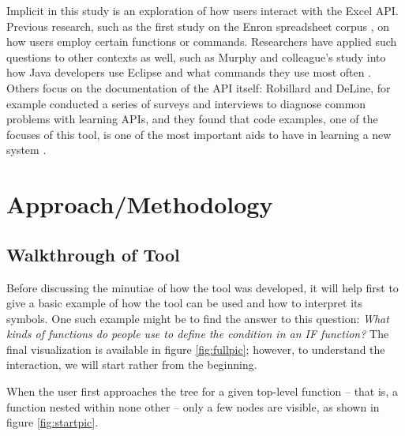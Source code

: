 \documentclass[conference]{IEEEtran}
\begin{document}
	Implicit in this study is an exploration of how users interact with the Excel
	API. Previous research, such as the first study on the Enron spreadsheet corpus
	\cite{hermans2015enron}, on how users employ certain functions or commands.
	Researchers have applied such questions to other contexts as well, such as
	Murphy and colleague's study into how Java developers use Eclipse and what
	commands they use most often \cite{murphy2006java}.  Others focus on the
	documentation of the API itself: Robillard and DeLine, for example conducted a
	series of surveys and interviews to diagnose common problems with learning
	APIs, and they found that code examples, one of the focuses of this tool, is
	one of the most important aids to have in learning a new system
	\cite{robillard2011field}.
	
	\section{Approach/Methodology} \subsection{Walkthrough of Tool} Before
	discussing the minutiae of how the tool was developed, it will help first to
	give a basic example of how the tool can be used and how to interpret its
	symbols. One such example might be to find the answer to this question:
	\textit{ What kinds of functions do people use to define the condition in an IF
		function?} The final visualization is available in figure \ref{fig:fullpic};
	however, to understand the interaction, we will start rather from the
	beginning. \par
	
	When the user first approaches the tree for a given top-level function -- that
	is, a function nested within none other -- only a few nodes are visible, as
	shown in figure \ref{fig:startpic}. \par
	
\end{document}

